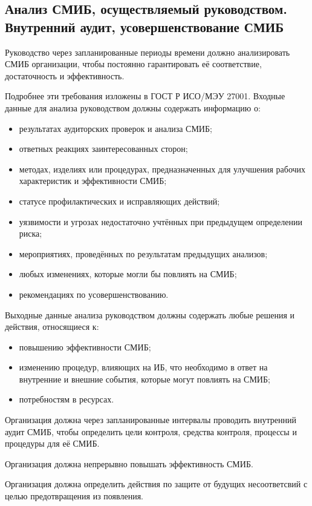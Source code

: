 \documentclass[12pt, russian, oneside, article]{ncc}
\begin{document}
\subsection{Анализ СМИБ, осуществляемый руководством. Внутренний аудит, усовершенствование СМИБ}
\label{sec-4_4}


Руководство через запланированные периоды времени должно анализировать СМИБ организации, чтобы постоянно гарантировать её соответствие, достаточность и эффективность.

Подробнее эти требования изложены в ГОСТ Р ИСО/МЭУ 27001. Входные данные для анализа руководством должны содержать информацию о:
\begin{itemize}
\item результатах аудиторских проверок и анализа СМИБ;
\item ответных реакциях заинтересованных сторон;
\item методах, изделиях или процедурах, предназначенных для улучшения рабочих характеристик и эффективности СМИБ;
\item статусе профилактических и исправляющих действий;
\item уязвимости и угрозах недостаточно учтённых при предыдущем определении риска;
\item мероприятиях, проведённых по результатам предыдущих анализов;
\item любых изменениях, которые могли бы повлиять на СМИБ;
\item рекомендациях по усовершенствованию.
\end{itemize}

Выходные данные анализа руководством должны содержать любые решения и действия, относящиеся к:
\begin{itemize}
\item повышению эффективности СМИБ;
\item изменению процедур, влияющих на ИБ, что необходимо в ответ на внутренние и внешние события, которые могут повлиять на СМИБ;
\item потребностям в ресурсах.
\end{itemize}

Организация должна через запланированные интервалы проводить внутренний аудит СМИБ, чтобы определить цели контроля, средства контроля, процессы и процедуры для её СМИБ.

Организация должна непрерывно повышать эффективность СМИБ.

Организация должна определить действия по защите от будущих несоответсвий с целью предотвращения из появления.
\end{document}

